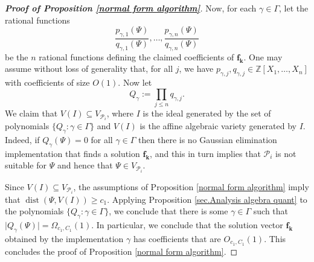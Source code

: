\documentclass[12pt,a4paper,twoside,reqno]{amsart}
\numberwithin{equation}{section}
\begin{document}
\begin{proof}[\textbf{Proof of \emph{Proposition \ref{normal form algorithm}}}]
Now, for each $\gamma\in \Gamma$, let the rational functions $$\frac{p_{\gamma,1}(\Psi)}{q_{\gamma,1}(\Psi)},\dots,\frac{p_{\gamma,n}(\Psi)}{q_{\gamma,n}(\Psi)}$$ be the $n$ rational functions defining the claimed coefficients of $\mathbf{f_k}$. One may assume without loss of generality that, for all $j$, we have $p_{\gamma,j},q_{\gamma,j}\in \mathbb{Z}[X_1,\dots,X_n]$ with coefficients of size $O(1)$. Now let $$Q_\gamma := \prod\limits_{j\leqslant n}q_{\gamma,j}.$$ We claim that $V(I)\subseteq V_{\mathcal{P}_i}$, where $I$ is the ideal generated by the set of polynomials $\{Q_\gamma:\gamma\in \Gamma\}$ and $V(I)$ is the affine algebraic variety generated by $I$. Indeed, if $Q_{\gamma}(\Psi)=0$ for all $\gamma\in \Gamma$ then there is no Gaussian elimination implementation that finds a solution $\mathbf{f_k}$, and this in turn implies that $\mathcal{P}_i$ is not suitable for $\Psi$ and hence that $\Psi \in V_{\mathcal{P}_i}$.

 Since $V(I)\subseteq V_{\mathcal{P}_i}$, the assumptions of Proposition \ref{normal form algorithm} imply that $\operatorname{dist}(\Psi,V(I))\geqslant c_1$. Applying Proposition \ref{sec.Analysis algebra quant} to the polynomials $\{Q_\gamma:\gamma \in\Gamma\}$, we conclude that there is some $\gamma\in\Gamma$ such that $\vert Q_\gamma(\Psi)\vert = \Omega_{c_1,C_1}(1)$. In particular, we conclude that the solution vector $\mathbf{f_k}$ obtained by the implementation $\gamma$ has coefficients that are $O_{c_1,C_1}(1)$. This concludes the proof of Proposition \ref{normal form algorithm}.
\end{proof}
 
\end{document}
